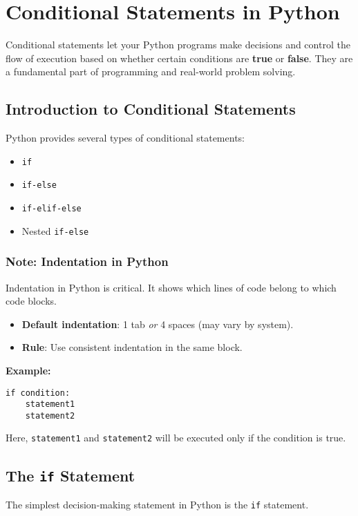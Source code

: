 \chapter{Conditional Statements in Python}
\label{ch:conditional_statements}

Conditional statements let your Python programs make decisions and control the flow of execution based on whether certain conditions are \textbf{true} or \textbf{false}. They are a fundamental part of programming and real-world problem solving.

\section{Introduction to Conditional Statements}

Python provides several types of conditional statements:
\begin{itemize}
    \item \texttt{if}
    \item \texttt{if-else}
    \item \texttt{if-elif-else}
    \item Nested \texttt{if-else}
\end{itemize}

\subsection*{Note: Indentation in Python}

Indentation in Python is critical. It shows which lines of code belong to which code blocks.
\begin{itemize}
    \item \textbf{Default indentation}: 1 tab \emph{or} 4 spaces (may vary by system).
    \item \textbf{Rule}: Use consistent indentation in the same block.
\end{itemize}
\textbf{Example:}
\begin{verbatim}
if condition:
    statement1
    statement2
\end{verbatim}
Here, \texttt{statement1} and \texttt{statement2} will be executed only if the condition is true.

\section{The \texttt{if} Statement}

The simplest decision-making statement in Python is the \texttt{if} statement.

